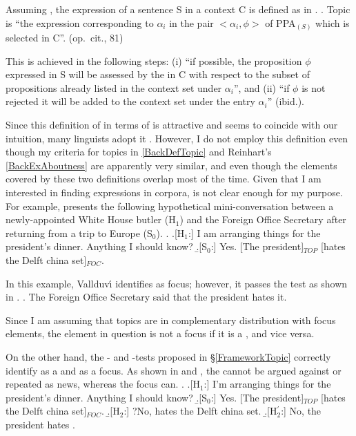 Assuming \Last, the  expression of a sentence S in a context C
is defined as in \Next.
%
\ex. \label{BackExAboutness} Topic is ``the expression corresponding to $\alpha_{i}$ in the pair $<\alpha_{i},\phi>$ of PPA$_{(S)}$ which is selected in C''.
    \hfill{(op.~cit., 81)}

This is achieved in the following steps:
(i) ``if possible, the proposition $\phi$ expressed in S will be assessed by the  in C with respect to the subset of propositions already listed in the context set under $\alpha_{i}$'', and
(ii) ``if $\phi$ is not rejected it will be added to the context set under the entry $\alpha_{i}$'' ({ibid.}).

Since this definition of  in terms of  is attractive and seems to coincide with our intuition,
many linguists adopt it \cite[e.g.,][]{lambrecht94,erteschik-shir07}.
However, I do not employ this definition
even though my criteria for topics in \ref{BackDefTopic} and Reinhart's \ref{BackExAboutness} are apparently very similar, and even though the elements covered by these two definitions overlap most of the time.
Given that I am interested in finding  expressions in corpora,
 is not clear enough for my purpose.
For example,  presents the following hypothetical mini-conversation between a newly-appointed White House butler (H$_{1}$) and the Foreign Office Secretary after returning from a trip to Europe (S$_{0}$).
%
\ex. \a.[H$_{1}$:] I am arranging things for the president's dinner. Anything I should know?
     \b.[S$_{0}$:] Yes. [The president]$_{TOP}$ [hates the Delft china set]$_{FOC}$.\\
     \begin{flushright}
     {\cite[9, 12]{vallduvi94}}
     \end{flushright}

In this example, Vallduv\'{\i} identifies  as focus; however, it passes the  test as shown in \Next.
%
\ex. The Foreign Office Secretary said  that the president hates it.

Since I am assuming that topics are in complementary distribution with focus elements,
the element in question is not a focus if it is a , and vice versa.

On the other hand, the - and -tests proposed in \S \ref{FrameworkTopic} correctly identify  as a  and  as a focus.
As shown in \Next[H$_{2}$] and \NNext[H$_{2}$],
the   cannot be argued against or repeated as news,
whereas the focus  can.
%
\ex. \a.[H$_{1}$:] I'm arranging things for the president's dinner. Anything I should know?
     \b.[S$_{0}$:] Yes. [The president]$_{TOP}$ [hates the Delft china set]$_{FOC}$.
     \b.[H$_{2}$:] ?No,  hates the Delft china set.
     \b.[H$_{2}^{\prime}$:] No, the president hates .


